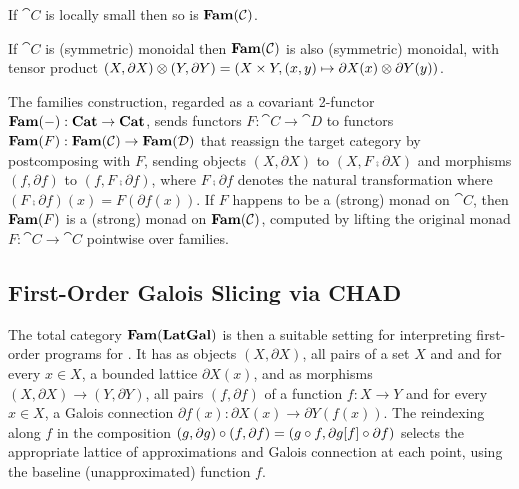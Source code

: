 \begin{proposition}
\label{prop:Grothendieck:fam-inherits-local-smallness}
If $\cat{C}$ is locally small then so is $\mathbf{Fam}(\mathcal{C})$.
\end{proposition}

\begin{proposition}
\label{prop:Grothendieck:fam-inherits-products}
If $\cat{C}$ is (symmetric) monoidal then $\mathbf{Fam}(\mathcal{C})$ is also (symmetric) monoidal, with tensor product
$(X, \partial X) \otimes (Y, \partial Y) = (X \times Y,(x, y) \mapsto \partial X(x) \otimes \partial Y(y))$.
\end{proposition}

The families construction, regarded as a covariant 2-functor $\mathbf{Fam}(-): \mathbf{Cat} \to \mathbf{Cat}$, sends functors $F:
\cat{C} \to \cat{D}$ to functors $\mathbf{Fam}(F): \mathbf{Fam}(\mathcal{C}) \to \mathbf{Fam}(\mathcal{D})$ that reassign the target category
by postcomposing with $F$, sending objects $(X, \partial X)$ to $(X, F \comp \partial X)$ and morphisms $(f,
\partial f)$ to $(f, F \comp \partial f)$, where $F \comp \partial f$ denotes the natural transformation where
$(F \comp \partial f)(x) = F(\partial f(x))$. If $F$ happens to be a (strong) monad on $\cat{C}$, then
$\mathbf{Fam}(F)$ is a (strong) monad on $\mathbf{Fam}(\mathcal{C})$, computed by lifting the original monad $F: \cat{C} \to
\cat{C}$ pointwise over families.

\subsection{First-Order Galois Slicing via CHAD}
\label{sec:fam:galois-slicing}

The total category $\mathbf{Fam}(\mathbf{LatGal})$ is then a suitable setting for interpreting first-order programs for \GPS.
It has as objects $(X, \partial X)$, all pairs of a set $X$ and and for every $x \in X$, a bounded lattice
$\partial X(x)$, and as morphisms $(X, \partial X) \to (Y, \partial Y)$, all pairs $(f, \partial f)$ of a
function $f: X \to Y$ and for every $x \in X$, a Galois connection $\partial f(x): \partial X(x) \to \partial
Y(f(x))$. The reindexing along $f$ in the composition $(g, \partial g) \circ (f, \partial f) = (g \circ f,
\partial g[f] \circ \partial f)$ selects the appropriate lattice of approximations and Galois
connection at each point, using the baseline (unapproximated) function $f$.


